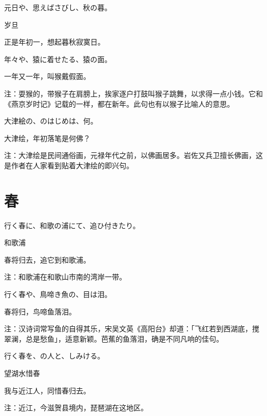 \begin{haiku}
    {\FH 元日や、思えばさびし、秋の暮。}

    {\FK 岁旦}

    {\FK 正是年初一，想起暮秋寂寞日。}
\end{haiku}

\begin{haiku}
    {\FH 年々や、猿に着せたる、猿の面。}

    {\FK 一年又一年，叫猴戴假面。}

    {\FT 注：耍猴的，带猴子在肩膀上，挨家逐户打鼓叫猴子跳舞，以求得一点小钱。它和《燕京岁时记》记载的一样，都在新年。此句也有以猴子比喻人的意思。}
\end{haiku}

\begin{haiku}
    {\FH 大津絵の、のはじめは、何。}

    {\FK 大津绘，年初落笔是何佛？}

    {\FT 注：大津绘是民间通俗画，元禄年代之前，以佛画居多。岩佐又兵卫擅长佛画，这是作者在人家看到贴着大津绘的即兴句。}
\end{haiku}

\section{\FK 春}

\setcounter{haikucounter}{0}

\begin{haiku}
    {\FH 行く春に、和歌の浦にて、追ひ付きたり。}

    {\FK 和歌浦}

    {\FK 春将归去，追它到和歌浦。}

    {\FT 注：和歌浦在和歌山市南的湾岸一带。}
\end{haiku}

\begin{haiku}
    {\FH 行く春や、鳥啼き魚の、目は泪。}

    {\FK 春将归，鸟啼鱼落泪。}

    {\FT 注：汉诗词常写鱼的自得其乐，宋吴文英《高阳台》却道：「飞红若到西湖底，搅翠澜，总是愁鱼」，适意新颖。芭蕉的鱼落泪，确是不同凡响的佳句。}
\end{haiku}

\begin{haiku}
    {\FH 行く春を、の人と、しみける。}

    {\FK 望湖水惜春}

    {\FK 我与近江人，同惜春归去。}

    {\FT 注：近江，今滋贺县境内，琵琶湖在这地区。}
\end{haiku}

